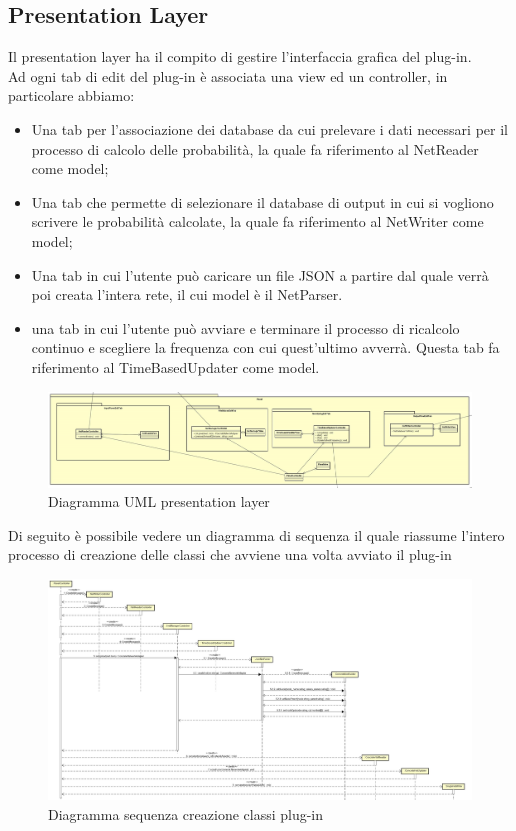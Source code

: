 \subsection{Presentation Layer}
Il presentation layer ha il compito di gestire l'interfaccia grafica del plug-in.\\
Ad ogni tab di edit del plug-in è associata una view ed un controller, in particolare abbiamo:
\begin{itemize}
	\item Una tab per l’associazione dei database da cui prelevare i dati necessari per il processo di calcolo delle probabilità, la quale fa riferimento al NetReader come model;
	\item Una tab che permette di selezionare il database di output in cui si vogliono scrivere le probabilità calcolate, la quale fa riferimento al NetWriter come model;
	\item Una tab in cui l'utente può caricare un file JSON a partire dal quale verrà poi creata l'intera rete, il cui model è il NetParser.
	\item una tab in cui l'utente può avviare e terminare il processo di ricalcolo continuo e scegliere la frequenza con cui quest'ultimo avverrà. Questa tab fa riferimento al TimeBasedUpdater come model.
\end{itemize}
\begin{figure} [H]
	\centering
	\includegraphics[scale=0.17]{Img/PresentationLayer}
	\caption{Diagramma UML presentation layer}\label{}
\end{figure}
Di seguito è possibile vedere un diagramma di sequenza il quale riassume l'intero processo di creazione delle classi che avviene una volta avviato il plug-in
\begin{figure} [H]
	\centering
	\includegraphics[scale=0.2]{Img/Creazione}
	\caption{Diagramma sequenza creazione classi plug-in}\label{}
\end{figure}
\pagebreak